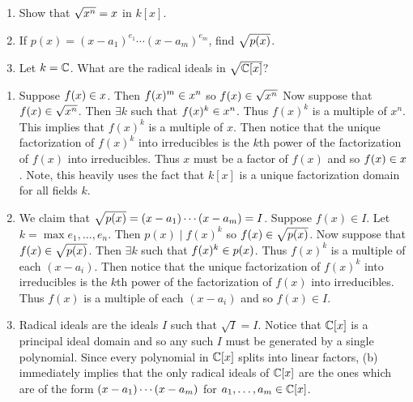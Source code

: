 \documentclass[letterpaper, 11pt, oneside]{book}
\begin{document}
\begin{exercise}\label{ex:UAG_1.1.7}
  \begin{enumerate}[label= (\alph*)]
    \item Show that $\sqrt{\ideal{x^{n}}} = \ideal{x}$ in $k[x]$.
    \item If $p(x) = (x - a_{1})^{e_{1}} \cdots (x - a_{m})^{e_{m}}$, find $\sqrt{\ideal{p(x)}}$.
    \item Let $k = \mathbb{C}$.
          What are the radical ideals in $\sqrt{\mathbb{C}[x]}$?
  \end{enumerate}
\end{exercise}
\begin{pf}
  \begin{enumerate}[label= (\alph*)]
    \item Suppose $f(x) \in \ideal{x}$.
          Then $f(x)^{m} \in \ideal{x^{n}}$ so $f(x) \in \sqrt{\ideal{x^{n}}}$
          Now suppose that $f(x) \in \sqrt{\ideal{x^{n}}}$.
          Then $\exists k$ such that $f(x)^{k} \in \ideal{x^{n}}$.
          Thus $f(x)^{k}$ is a multiple of $x^{n}$.
          This implies that $f(x)^{k}$ is a multiple of $x$.
          Then notice that the unique factorization of $f(x)^{k}$ into irreducibles is the $k$th power of the factorization of $f(x)$ into irreducibles.
          Thus $x$ must be a factor of $f(x)$ and so $f(x) \in \ideal{x}$.
          Note, this heavily uses the fact that $k[x]$ is a unique factorization domain for all fields $k$.
    \item We claim that $\sqrt{\ideal{p(x)}} = \ideal{(x - a_{1}) \cdots (x - a_{m})} = I$.
          Suppose $f(x) \in I$.
          Let $k = \max{e_{1}, \ldots, e_{n}}$.
          Then $p(x) \mid f(x)^{k}$ so $f(x) \in \sqrt{\ideal{p(x)}}$.
          Now suppose that $f(x) \in \sqrt{\ideal{p(x)}}$.
          Then $\exists k$ such that $f(x)^{k} \in \ideal{p(x)}$.
          Thus $f(x)^{k}$ is a multiple of each $(x - a_{i})$.
          Then notice that the unique factorization of $f(x)^{k}$ into irreducibles is the $k$th power of the factorization of $f(x)$ into irreducibles.
          Thus $f(x)$ is a multiple of each $(x - a_{i})$ and so $f(x) \in I$.
    \item Radical ideals are the ideals $I$ such that $\sqrt{I} = I$.
          Notice that $\mathbb{C}[x]$ is a principal ideal domain and so any such $I$ must be generated by a single polynomial.
          Since every polynomial in $\mathbb{C}[x]$ splits into linear factors, (b) immediately implies that the only radical ideals of $\mathbb{C}[x]$ are the ones which are of the form $\ideal{(x - a_{1}) \cdots (x - a_{m})}$ for $a_{1}, \ldots, a_{m} \in \mathbb{C}[x]$.
  \end{enumerate}
\end{pf}
\end{document}
